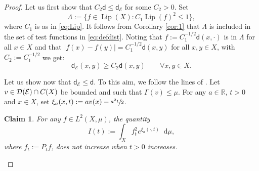 \documentclass[JEP,XML,SOM,Unicode,published]{cedram}
\let\sep:
\newcommand{\NoChangel}[1]{%
\expandafter\let\csname old\string#1\endcsname=#1
\let#1=\relax
\newcommand{#1}{\mathcode`l="716C\csname old\string#1\endcsname\mathcode`l="7160 }%
}
\theoremstyle{plain}
\newtheorem{claim}[theorem]{Claim}
\theoremstyle{definition}
\newcommand{\setR}{\mathbb{R}}
\newcommand{\cE}{\mathcal{E}}
\newcommand{\cD}{\mathcal{D}}
\newcommand{\di}{\mathop{}\!\mathrm{d}}
\newcommand{\loc}{\mathrm{loc}}\NoChangel{\loc}
\DeclareMathOperator{\Lip}{Lip}
\newcommand{\dist}{\mathsf{d}}
\begin{document}
\begin{proof}
Let us first show that $C_2\dist \le \dist_\cE$ for some $C_2>0$. Set
\[
\Lambda:=\{f \in \Lip(X) \sep C_1\Lip(f)^2 \le 1\},
\]
where $C_1$ is as in \eqref{eq:Lip}. It follows from Corollary \ref{cor:1} that $\Lambda$ is included in the set of test functions in \eqref{eq:defdist}. Noting that $f:=C_1^{-1/2}\dist(x,\cdot)$ is in $\Lambda$ for all $x \in X$ and that $|f(x)-f(y)|=C_1^{-1/2}\dist(x,y)$ for all $x,y \in X$, with $C_2:=C_1^{-1/2}$ we get:
\[
\dist_\cE(x,y)\ge C_2\dist(x,y) \qquad \forall x,y \in X.
\]

Let us show now that $\dist_\cE \le \dist$. To this aim, we follow the lines of \cite{Grigor'yanEd}. Let $v \in \cD_{\loc}(\cE)\cap C(X)$ be bounded and such that $\Gamma(v)\le \mu$. For any $a \in \setR$, $t>0$ and $x \in X$, set $\xi_a(x,t):=a v(x) - \sfrac{a^2t}{2}$.

\begin{claim}
For any $f \in L^2(X,\mu)$, the quantity
\[
I(t):=\int_X f_t^2 e^{\xi_a(\cdot,t)} \di \mu,
\]
where $f_t:=P_t f$, does not increase when $t>0$ increases.
\end{claim}


\end{proof}
\end{document}
